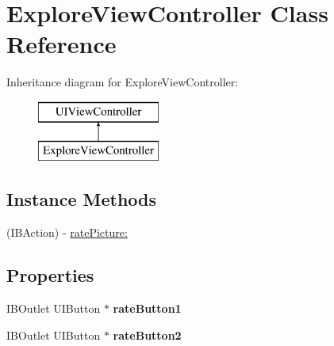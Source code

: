 \hypertarget{interface_explore_view_controller}{\section{Explore\-View\-Controller Class Reference}
\label{interface_explore_view_controller}
}
Inheritance diagram for Explore\-View\-Controller\-:\begin{figure}[H]
\begin{center}
\leavevmode
\includegraphics[height=2.000000cm]{interface_explore_view_controller}
\end{center}
\end{figure}
\subsection*{Instance Methods}
\begin{DoxyCompactItemize}
\item 
(I\-B\-Action) -\/ \hyperlink{interface_explore_view_controller_a31a154123c6502cdcff19f784ec516ac}{rate\-Picture\-:}
\end{DoxyCompactItemize}
\subsection*{Properties}
\begin{DoxyCompactItemize}
\item 
\hypertarget{interface_explore_view_controller_a6f44da3f9becef1dcc9efa939c45838d}{I\-B\-Outlet U\-I\-Button $\ast$ {\bfseries rate\-Button1}}\label{interface_explore_view_controller_a6f44da3f9becef1dcc9efa939c45838d}

\item 
\hypertarget{interface_explore_view_controller_a7bb00accba1ce81eba115820c2500a5f}{I\-B\-Outlet U\-I\-Button $\ast$ {\bfseries rate\-Button2}}\label{interface_explore_view_controller_a7bb00accba1ce81eba115820c2500a5f}

\end{DoxyCompactItemize}



